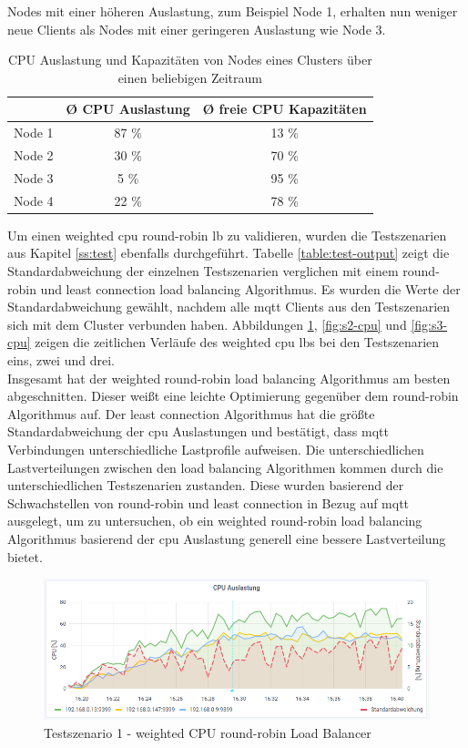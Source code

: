 Nodes mit einer höheren Auslastung, zum Beispiel Node 1, erhalten nun weniger neue Clients als Nodes mit einer geringeren Auslastung wie Node 3.
\\
\begin{table}[h!]
\centering
\renewcommand{\arraystretch}{1.5}
\begin{tabular}{|l|c|c|}
    \hline
    & \textbf{Ø CPU Auslastung} & \textbf{Ø freie CPU Kapazitäten} \\
    \hline
    \hline
    Node 1 & 87 \% & 13 \% \\
    \hline
    Node 2 & 30 \% & 70 \% \\
    \hline
    Node 3 & 5 \% & 95 \% \\
    \hline
    Node 4 & 22 \% & 78 \% \\
    \hline
\end{tabular}
\caption{CPU Auslastung und Kapazitäten von Nodes eines Clusters über einen beliebigen Zeitraum}
\label{table:example-cluster-cpu}
\end{table}
Um einen weighted \ac{cpu} round-robin \acl{lb} zu validieren, wurden die Testszenarien aus Kapitel \ref{ss:test} ebenfalls durchgeführt.
Tabelle \ref{table:test-output} zeigt die Standardabweichung der einzelnen Testszenarien verglichen mit einem round-robin und least connection load balancing Algorithmus.
Es wurden die Werte der Standardabweichung gewählt, nachdem alle \ac{mqtt} Clients aus den Testszenarien sich mit dem Cluster verbunden haben.
Abbildungen \ref{fig:s1-cpu}, \ref{fig:s2-cpu} und \ref{fig:s3-cpu} zeigen die zeitlichen Verläufe des weighted \ac{cpu} \aclp{lb} bei den Testszenarien eins, zwei und drei.
\\
Insgesamt hat der weighted round-robin load balancing Algorithmus am besten abgeschnitten. Dieser wei{\ss}t eine leichte Optimierung gegenüber dem round-robin Algorithmus auf. Der least connection Algorithmus hat die grö{\ss}te Standardabweichung der \ac{cpu} Auslastungen und bestätigt, dass \ac{mqtt} Verbindungen unterschiedliche Lastprofile aufweisen.
Die unterschiedlichen Lastverteilungen zwischen den load balancing Algorithmen kommen durch die unterschiedlichen Testszenarien zustanden. Diese wurden basierend der Schwachstellen von round-robin und least connection in Bezug auf \ac{mqtt} ausgelegt, um zu untersuchen, ob ein weighted round-robin load balancing Algorithmus basierend der \ac{cpu} Auslastung generell eine bessere Lastverteilung bietet.
\begin{figure}
    \centering
    \includegraphics[scale=0.8]{images/s1_cpu.png}
    \caption{Testszenario 1 - weighted CPU round-robin Load Balancer}
    \label{fig:s1-cpu}
\end{figure}
